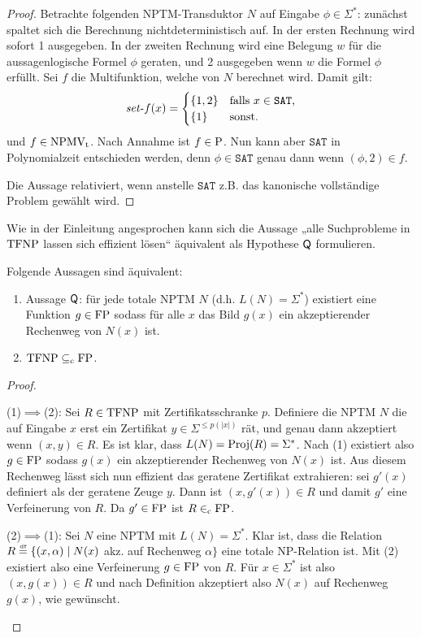 \begin{proof}
    Betrachte folgenden NPTM-Transduktor $N$ auf Eingabe $\phi\in\Sigma^*$: zunächst spaltet sich die Berechnung nichtdeterministisch auf. In der ersten Rechnung wird sofort 1 ausgegeben. In der zweiten Rechnung wird eine Belegung $w$ für die aussagenlogische Formel $\phi$ geraten, und 2 ausgegeben wenn $w$ die Formel $\phi$ erfüllt. Sei $f$ die Multifunktion, welche von $N$ berechnet wird.
    Damit gilt:
    \[ \fset{}f(x) = \begin{cases} \{ 1, 2\} & \text{falls $x\in\mathtt{SAT}$,} \\ \{ 1\} & \text{sonst. } \end{cases} \]
    und $f\in\NPMVt$.
    Nach Annahme ist $f\in \P$. Nun kann aber $\mathtt{SAT}$ in Polynomialzeit entschieden werden, denn $\phi\in\mathtt{SAT}$ genau dann wenn $(\phi, 2) \in f$.

    Die Aussage relativiert, wenn anstelle $\mathtt{SAT}$ z.B. das kanonische vollständige Problem gewählt wird.
\end{proof}
Wie in der Einleitung angesprochen kann sich die Aussage „alle Suchprobleme in $\TFNP$ lassen sich effizient lösen“ äquivalent als Hypothese $\hQ$ formulieren.
\begin{observation}\label{obs:tfnp-q}
    Folgende Aussagen sind äquivalent:
    \begin{enumerate}
        \item Aussage $\hQ$: für jede totale NPTM $N$ (d.h. $L(N)=\Sigma^*$) existiert eine Funktion $g\in\FP$ sodass für alle $x$ das Bild $g(x)$ ein akzeptierender Rechenweg von $N(x)$ ist. 
        \item $\TFNP\subseteqc \FP$.
    \end{enumerate}
\end{observation}
\begin{proof}
\begin{prooflist}
\item (1)$\implies$(2): Sei $R\in\TFNP$ mit Zertifikatsschranke $p$. Definiere die NPTM $N$ die auf Eingabe $x$ erst ein Zertifikat $y\in\Sigma^{\leq p(|x|)}$ rät, und genau dann akzeptiert wenn $(x,y)\in R$. Es ist klar, dass $L(N)=\Proj(R)=\Sigma^*$. Nach (1) existiert also $g\in\FP$ sodass $g(x)$ ein akzeptierender Rechenweg von $N(x)$ ist. Aus diesem Rechenweg lässt sich nun effizient das geratene Zertifikat extrahieren: sei $g'(x)$ definiert als der geratene Zeuge $y$. Dann ist $(x,g'(x))\in R$ und damit $g'$ eine Verfeinerung von $R$. Da $g'\in\FP$ ist $R\inc\FP$.

\item (2)$\implies$(1): Sei $N$ eine NPTM mit $L(N)=\Sigma^*$. Klar ist, dass die Relation $R\defeq \{ (x,\alpha) \mid N(x)$ akz. auf Rechenweg $\alpha\}$ eine totale NP-Relation ist.
    Mit (2) existiert also eine Verfeinerung $g\in\FP$ von $R$. Für $x\in\Sigma^*$ ist also $(x, g(x))\in R$ und nach Definition akzeptiert also $N(x)$ auf Rechenweg $g(x)$, wie gewünscht.
\end{prooflist}
\end{proof}

